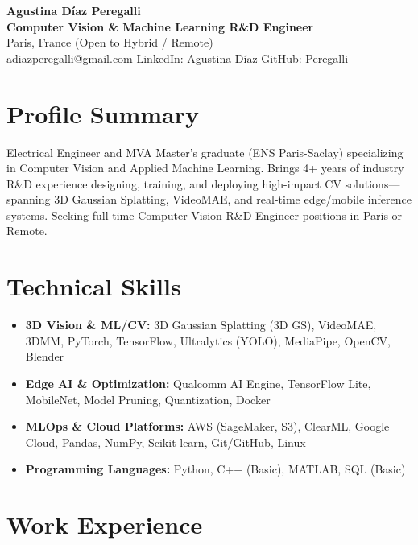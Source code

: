 \documentclass[10pt, a4paper]{article}
\begin{document}
\begin{center}
    {\LARGE \textbf{Agustina Díaz Peregalli}} \\ \vspace{2pt}
    {\large \textbf{Computer Vision \& Machine Learning R\&D Engineer}} \\ \vspace{2pt}
    Paris, France \textbar{} (Open to Hybrid / Remote) \\ \vspace{2pt}
    \href{mailto:adiazperegalli@gmail.com}{adiazperegalli@gmail.com} \textbar{} 
    \href{https://www.linkedin.com/in/agustina-diaz-peregalli/}{LinkedIn: Agustina Díaz} \textbar{} 
    \href{https://github.com/Peregalli}{GitHub: Peregalli}
\end{center}

\section{Profile Summary}
Electrical Engineer and MVA Master's graduate (ENS Paris-Saclay) specializing in Computer Vision and Applied Machine Learning. Brings 4+ years of industry R\&D experience designing, training, and deploying high-impact CV solutions—spanning 3D Gaussian Splatting, VideoMAE, and real-time edge/mobile inference systems. Seeking full-time Computer Vision R\&D Engineer positions in Paris or Remote.

\section{Technical Skills}
\begin{itemize}
    \item \textbf{3D Vision \& ML/CV:} 3D Gaussian Splatting (3D GS), VideoMAE, 3DMM, PyTorch, TensorFlow, Ultralytics (YOLO), MediaPipe, OpenCV, Blender
    \item \textbf{Edge AI \& Optimization:} Qualcomm AI Engine, TensorFlow Lite, MobileNet, Model Pruning, Quantization, Docker
    \item \textbf{MLOps \& Cloud Platforms:} AWS (SageMaker, S3), ClearML, Google Cloud, Pandas, NumPy, Scikit-learn, Git/GitHub, Linux
    \item \textbf{Programming Languages:} Python, C++ (Basic), MATLAB, SQL (Basic)
\end{itemize}

\section{Work Experience}
\end{document}
